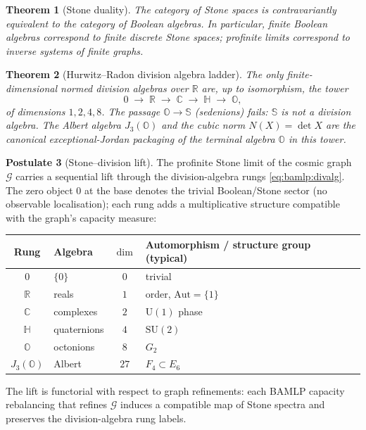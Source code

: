 \documentclass[11pt]{article}
\theoremstyle{plain}
\newtheorem{theorem}{Theorem}[section]
\theoremstyle{definition}
\newtheorem{postulate}[theorem]{Postulate}
\theoremstyle{remark}
\begin{document}
\begin{theorem}[Stone duality]\label{thm:bamlp:stone}
The category of Stone spaces is contravariantly equivalent to the category of
Boolean algebras. In particular, finite Boolean algebras correspond to finite
discrete Stone spaces; profinite limits correspond to inverse systems of finite
graphs.
\end{theorem}

\begin{theorem}[Hurwitz--Radon division algebra ladder]\label{thm:bamlp:hurwitz}
The only finite-dimensional \emph{normed} division algebras over $\mathbb{R}$
are, up to isomorphism, the tower
\begin{equation}
  0 \;\longrightarrow\; \mathbb{R} \;\longrightarrow\; \mathbb{C}
  \;\longrightarrow\; \mathbb{H} \;\longrightarrow\; \mathbb{O},
  \label{eq:bamlp:divalg}
\end{equation}
of dimensions $1,2,4,8$. The passage $\mathbb{O}\to\mathbb{S}$ (sedenions)
fails: $\mathbb{S}$ is not a division algebra. The Albert algebra
$J_3(\mathbb{O})$ and the cubic norm $N(X)=\det X$ are the canonical
exceptional-Jordan packaging of the terminal algebra $\mathbb{O}$ in this tower.
\end{theorem}

\begin{postulate}[Stone--division lift]\label{post:bamlp:lift}
The profinite Stone limit of the cosmic graph $\mathcal{G}$ carries a
sequential lift through the division-algebra rungs
\eqref{eq:bamlp:divalg}. The zero object $0$ at the base denotes the trivial
Boolean/Stone sector (no observable localisation); each rung adds a
multiplicative structure compatible with the graph's capacity measure:
\begin{center}
\small
\begin{tabular}{@{}clcl@{}}
\toprule
Rung & Algebra & $\dim$ & Automorphism / structure group (typical) \\
\midrule
$0$ & $\{0\}$ & $0$ & trivial \\
$\mathbb{R}$ & reals & $1$ & order, $\mathrm{Aut}=\{1\}$ \\
$\mathbb{C}$ & complexes & $2$ & $\mathrm{U}(1)$ phase \\
$\mathbb{H}$ & quaternions & $4$ & $\mathrm{SU}(2)$ \\
$\mathbb{O}$ & octonions & $8$ & $G_2$ \\
$J_3(\mathbb{O})$ & Albert & $27$ & $F_4\subset E_6$ \\
\bottomrule
\end{tabular}
\end{center}
The lift is functorial with respect to graph refinements: each BAMLP capacity
rebalancing that refines $\mathcal{G}$ induces a compatible map of Stone
spectra and preserves the division-algebra rung labels.
\end{postulate}
\end{document}
